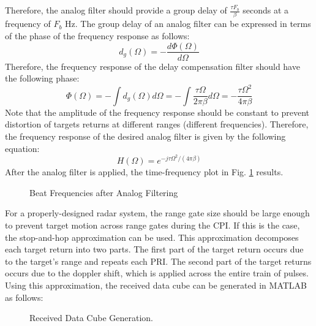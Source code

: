\documentclass[conference]{IEEEtran}
\begin{document}
Therefore, the analog filter should provide a group delay of $\frac{\tau F_b}{\beta}$ seconds at a frequency of $F_b$ Hz. The group delay of an analog filter can be expressed in terms of the phase of the frequency response as follows:
\begin{equation}
d_g(\Omega) = -\frac{d\Phi(\Omega)}{d\Omega}
\end{equation}
Therefore, the frequency response of the delay compensation filter should have the following phase:
\begin{equation}
\Phi(\Omega) = -\int d_g(\Omega)d\Omega = -\int\frac{\tau\Omega}{2\pi\beta}d\Omega = -\frac{\tau\Omega^2}{4\pi\beta}
\end{equation}
Note that the amplitude of the frequency response should be constant to prevent distortion of targets returns at different ranges (different frequencies). Therefore, the frequency response of the desired analog filter is given by the following equation:
\begin{equation}
H(\Omega) = e^{-j\tau\Omega^2/(4\pi\beta)}
\end{equation} 
After the analog filter is applied, the time-frequency plot in Fig. \ref{beat_freq_analog_filt} results.
\begin{figure}[H]
\centerline{}
\caption{Beat Frequencies after Analog Filtering}
\label{beat_freq_analog_filt}
\end{figure}
For a properly-designed radar system, the range gate size should be large enough to prevent target motion across range gates during the CPI. If this is the case, the stop-and-hop approximation can be used. This approximation decomposes each target return into two parts. The first part of the target return occurs due to the target's range and repeats each PRI. The second part of the target returns occurs due to the doppler shift, which is applied across the entire train of pulses. Using this approximation, the received data cube can be generated in MATLAB as follows:
\begin{figure}[H]
\centerline{}
\caption{Received Data Cube Generation.}
\label{adc_sig_gen}
\end{figure}
\end{document}
